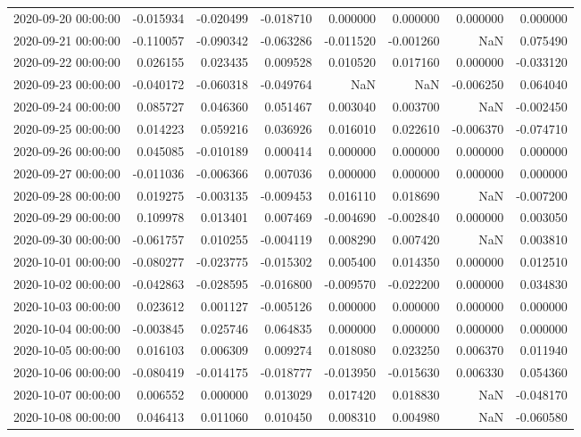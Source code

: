 \begin{tabular}{lrrrrrrr}
2020-09-20 00:00:00 & -0.015934 & -0.020499 & -0.018710 & 0.000000 & 0.000000 & 0.000000 & 0.000000 \\
2020-09-21 00:00:00 & -0.110057 & -0.090342 & -0.063286 & -0.011520 & -0.001260 & NaN & 0.075490 \\
2020-09-22 00:00:00 & 0.026155 & 0.023435 & 0.009528 & 0.010520 & 0.017160 & 0.000000 & -0.033120 \\
2020-09-23 00:00:00 & -0.040172 & -0.060318 & -0.049764 & NaN & NaN & -0.006250 & 0.064040 \\
2020-09-24 00:00:00 & 0.085727 & 0.046360 & 0.051467 & 0.003040 & 0.003700 & NaN & -0.002450 \\
2020-09-25 00:00:00 & 0.014223 & 0.059216 & 0.036926 & 0.016010 & 0.022610 & -0.006370 & -0.074710 \\
2020-09-26 00:00:00 & 0.045085 & -0.010189 & 0.000414 & 0.000000 & 0.000000 & 0.000000 & 0.000000 \\
2020-09-27 00:00:00 & -0.011036 & -0.006366 & 0.007036 & 0.000000 & 0.000000 & 0.000000 & 0.000000 \\
2020-09-28 00:00:00 & 0.019275 & -0.003135 & -0.009453 & 0.016110 & 0.018690 & NaN & -0.007200 \\
2020-09-29 00:00:00 & 0.109978 & 0.013401 & 0.007469 & -0.004690 & -0.002840 & 0.000000 & 0.003050 \\
2020-09-30 00:00:00 & -0.061757 & 0.010255 & -0.004119 & 0.008290 & 0.007420 & NaN & 0.003810 \\
2020-10-01 00:00:00 & -0.080277 & -0.023775 & -0.015302 & 0.005400 & 0.014350 & 0.000000 & 0.012510 \\
2020-10-02 00:00:00 & -0.042863 & -0.028595 & -0.016800 & -0.009570 & -0.022200 & 0.000000 & 0.034830 \\
2020-10-03 00:00:00 & 0.023612 & 0.001127 & -0.005126 & 0.000000 & 0.000000 & 0.000000 & 0.000000 \\
2020-10-04 00:00:00 & -0.003845 & 0.025746 & 0.064835 & 0.000000 & 0.000000 & 0.000000 & 0.000000 \\
2020-10-05 00:00:00 & 0.016103 & 0.006309 & 0.009274 & 0.018080 & 0.023250 & 0.006370 & 0.011940 \\
2020-10-06 00:00:00 & -0.080419 & -0.014175 & -0.018777 & -0.013950 & -0.015630 & 0.006330 & 0.054360 \\
2020-10-07 00:00:00 & 0.006552 & 0.000000 & 0.013029 & 0.017420 & 0.018830 & NaN & -0.048170 \\
2020-10-08 00:00:00 & 0.046413 & 0.011060 & 0.010450 & 0.008310 & 0.004980 & NaN & -0.060580 \\

\end{tabular}
